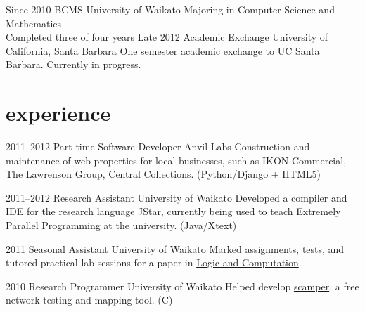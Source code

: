 \documentclass[]{boris-cv}
\begin{document}
\begin{entrylist}
  \entry
    {Since 2010}
    {BCMS }
    {University of Waikato}
    {Majoring in Computer Science and Mathematics\\Completed three of four years}
  \entry
    {Late 2012}
    {Academic Exchange}
    {University of California, Santa Barbara}
    {One semester academic exchange to UC Santa Barbara. Currently in progress.}
\end{entrylist}

\section{experience}

\begin{entrylist}
  \entry
    {2011--2012}
    {Part-time Software Developer}
    {Anvil Labs}
    {Construction and maintenance of web properties for local businesses,
		such as IKON Commercial, The Lawrenson Group, Central Collections.
        (Python/Django + HTML5)}

  \entry
    {2011--2012}
    {Research Assistant}
    {University of Waikato}
    {Developed a compiler and IDE for the research language
    \href{http://www.cs.waikato.ac.nz/research/jstar/}{JStar}, currently being used to teach
    \href{http://papers.waikato.ac.nz/subjects/COMP/COMP553}
    {Extremely Parallel Programming} at the university. (Java/Xtext)}

  \entry
    {2011}
    {Seasonal Assistant}
    {University of Waikato}
    {Marked assignments, tests, and tutored
    practical lab sessions for a paper in 
    \href{http://papers.waikato.ac.nz/subjects/COMP/COMP235}
    {Logic and Computation}.}

  \entry
    {2010}
    {Research Programmer}
    {University of Waikato}
    {Helped develop
    \href{http://www.wand.net.nz/scamper}{scamper},
    a free network testing and mapping tool. (C)}
\end{entrylist}

\pagebreak
\end{document}
